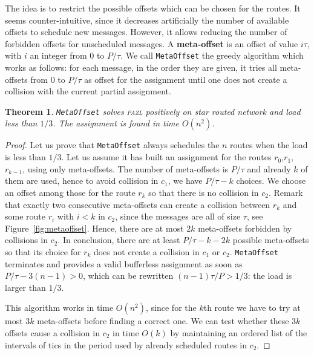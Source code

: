 \documentclass[a4paper,10pt]{article}
\newcommand\metaoffset{\texttt{MetaOffset}\xspace}
\newtheorem{theorem}{Theorem}
\newcommand\pazl{\textsc{pazl}\xspace}
\begin{document}
     The idea is to restrict the possible offsets which can be chosen for the routes. It seems counter-intuitive, since it decreases artificially the number of available offsets to schedule new messages. However, it allows reducing the number of forbidden offsets for unscheduled messages. A \textbf{meta-offset} is an offset of value $i\tau$, with $i$ an integer from $0$ to $P / \tau$. We call \metaoffset the greedy algorithm which works as follows: for each message, in the order they are given, it tries all meta-offsets from $0$ to $P/\tau$ as offset for the assignment until one does not create a collision with the current partial assignment. 


\begin{theorem}
\metaoffset solves \pazl positively on star routed network and load less than $1/3$. 
The assignment is found in time $O(n^2)$.
\end{theorem}
    \begin{proof}
    Let us prove that \metaoffset always schedules the $n$ routes when the load is less than $1/3$. Let us assume it has built an assignment for the routes $r_0$,$r_1$, $r_{k-1}$, using only meta-offsets. The number of meta-offsets is $P/\tau$ and already $k$ of them are used, hence to avoid collision in $c_1$, we have $P/\tau - k$ choices. We choose an offset among those for the route $r_k$ so that there is no collision in $c_2$. Remark that exactly two consecutive meta-offsets can create a collision between $r_k$ and some route $r_i$ with $i < k$ in $c_2$, since the messages are all of size $\tau$, see Figure~\ref{fig:metaoffset}. Hence, there are at most $2k$ meta-offsets forbidden by collisions in $c_2$. In conclusion, there are at least $P/\tau - k - 2k$ possible meta-offsets so that its choice for $r_k$ does not create a collision in $c_1$ or $c_2$.  \metaoffset terminates and provides a valid bufferless assignment as soon as $P/\tau - 3(n-1) > 0$, which can be rewritten $(n-1)\tau /P > 1/3$: the load is larger than $1/3$.

     This algorithm works in time $O(n^2)$, since for the $k$th route we have to try at most $3k$ meta-offsets before finding a correct one. We can test whether these $3k$ offsets cause a collision in $c_2$ in time $O(k)$ by maintaining an ordered list of the intervals of tics in the period used by already scheduled routes in $c_2$.
     \end{proof}
         
\end{document}
